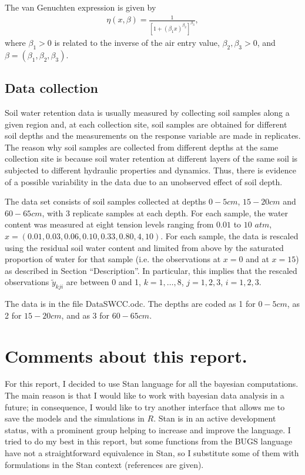\documentclass{article}
\begin{document}
The van Genuchten  expression is given by
\begin{eqnarray}
\label{vgm}
\eta \left(x, \beta \right)  =   \frac{1}{ \left[ 1 +  \left( \beta_1 x \right)^{\beta_2} \right]^{\beta_3}},
\end{eqnarray}
where $\beta_1>0$ is related to the inverse of the air entry value, $\beta_2, \beta_3> 0$, and $\beta=(\beta_1,\beta_2, \beta_3)$.

\newpage
\subsection*{Data collection}

Soil water retention data is usually measured by collecting soil samples along a given region and, at each collection site, soil samples are obtained for different soil depths and the measurements on the response variable are made in replicates. The reason why soil samples are collected from different depths at the same collection site is because soil water retention at different layers of the same soil is subjected to different hydraulic properties and dynamics. Thus, there is evidence of a possible variability in the data due to an unobserved effect of soil depth.

The data set consists of soil samples collected at depths $0-5cm$, $15-20cm$ and $60-65cm$, with 3 replicate samples at each depth. For each sample, the water content was measured at eight tension levels ranging from $0.01$ to $10$ $atm$, $x = \left({0.01,0.03,0.06,0.10,0.33,0.80,4,10} \right)$. For each sample, the data is rescaled using the residual soil water content and limited from above by the saturated proportion of water for that sample (i.e. the observations at $x=0$ and at $x=15$) as described in Section ``Description''. In particular, this implies that the rescaled observations $\tilde{y}_{kji}$ are between 0 and 1, $k=1,\ldots,8$, $j=1,2,3$, $i=1,2,3$.

The data is in the file DataSWCC.odc. The depths are coded as 1 for $0-5cm$, as 2 for $15-20cm$, and as 3 for $60-65cm$.

\section{Comments about this report.}

For this report, I decided to use Stan language for all the bayesian computations. The main reason is that I would like to work with bayesian data analysis in a future; in consequence, I would like to try another interface that allows me to save the models and the simulations in $R$. Stan is in an active development status, with a prominent group helping to increase and improve the language. I tried to do my best in this report, but some functions from the BUGS language have not a straightforward equivalence in Stan, so I substitute some of them with formulations in the Stan context (references are given).
\end{document}
